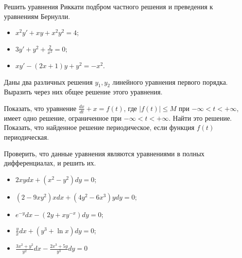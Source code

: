 \begin{task}
Решить уравнения Риккати подбром частного решения и преведения к уравнениям Бернулли.
\begin{itemize}
    \item $x^2y'+xy+x^2y^2=4$;
    \item $3y'+y^2+\frac{2}{x^2}=0$;
    \item $xy'-(2x+1)y+y^2=-x^2$.
\end{itemize}
\end{task}

\begin{task}
Даны два различных решения $y_1, y_2$ линейного уравнения первого порядка. Выразить через них общее решение этого уравнения.
\end{task}

\begin{task}
Показать, что уравнение $\frac{dx}{dt}+x=f(t)$, где $\vert f(t) \vert \leq M$ при $-\infty < t < + \infty$, имеет одно решение, ограниченное при $-\infty < t < + \infty$. Найти это решение. Показать, что найденное решение периодическое, если функция $f(t)$ периодическая.
\end{task}

\begin{task}
Проверить, что данные уравнения являются уравнениями в полных дифференциалах, и решить их.
\begin{itemize}
    \item $2xydx+(x^2-y^2)dy=0$;
    \item $(2-9xy^2)xdx+(4y^2-6x^3)ydy=0$;
    \item $e^{-y}dx-(2y+xy^{-x})dy=0$;
    \item $\frac{y}{x}dx+(y^3+\ln x)dy=0$;
    \item $\frac{3x^2+y^2}{y^2}dx-\frac{2x^3+5y}{y^3}dy=0$
\end{itemize}

\end{task}
